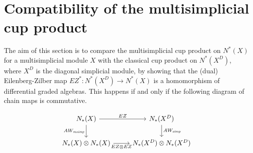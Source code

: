 \documentclass[a4paper,11pt]{article}
\theoremstyle{remark}
\theoremstyle{definition}
\begin{document}
 
\section{Compatibility of the multisimplicial cup product} \label{ultima}


The aim of this section is to compare the multisimplicial cup product on $N^*(X)$ for a multisimplicial module $X$
with the classical cup product on $N^*(X^D)$, where $X^D$ is the diagonal simplicial module, by showing 
that the (dual) Eilenberg-Zilber map $EZ^*: N^*(X^D) \to N^*(X)$  is a homomorphism of differential graded algebras.
This happens if and only if  the following diagram of chain maps is commutative.


	\begin{equation} \label{beh}
	\begin{tikzcd}
	N_{*}(X) \arrow[r,"{EZ}"] \arrow[d,"{AW_{\textit{msimp}}}"']		& N_{*}(X^{D})  \arrow[d, "{AW_{\textit{simp}}}"] \\
	N_{*}(X) \otimes N_{*}(X) \arrow[r,"{EZ\otimes EZ}"']
	& N_{*}(X^{D}) \otimes N_{*}(X^{D})
	\end{tikzcd}
	\end{equation}



	





\end{document}
